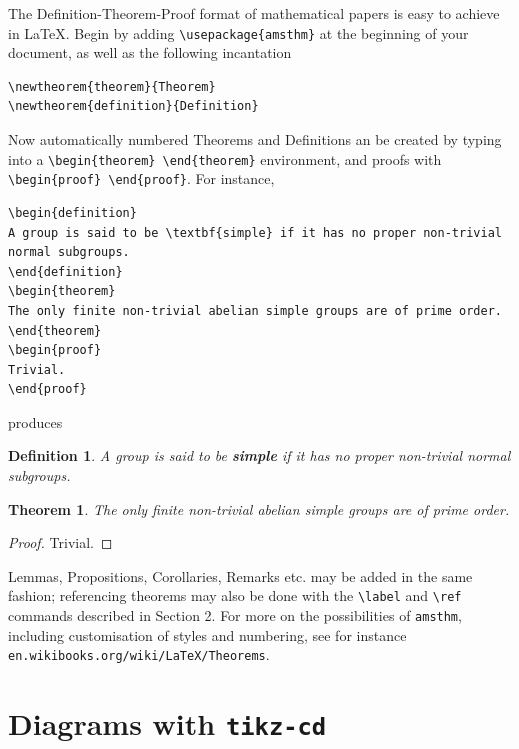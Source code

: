\documentclass[10pt]{article}
\newtheorem{definition}{Definition}
\newtheorem{theorem}{Theorem}
\begin{document}
The Definition-Theorem-Proof format of mathematical papers is easy to achieve in \LaTeX. Begin by adding \verb$\usepackage{amsthm}$ at the beginning of your document, as well as the following incantation
\begin{verbatim}
\newtheorem{theorem}{Theorem}
\newtheorem{definition}{Definition}
\end{verbatim}
Now automatically numbered Theorems and Definitions an be created by typing into a \verb$\begin{theorem} \end{theorem}$ environment, and proofs with \verb$\begin{proof} \end{proof}$. For instance,
\begin{verbatim}
\begin{definition}
A group is said to be \textbf{simple} if it has no proper non-trivial normal subgroups. 
\end{definition}
\begin{theorem}
The only finite non-trivial abelian simple groups are of prime order.
\end{theorem}
\begin{proof}
Trivial.
\end{proof}
\end{verbatim}
produces
\begin{definition}
A group is said to be \textbf{simple} if it has no proper non-trivial normal subgroups. 
\end{definition}
\begin{theorem}
The only finite non-trivial abelian simple groups are of prime order.
\end{theorem}
\begin{proof}
Trivial.
\end{proof}

Lemmas, Propositions, Corollaries, Remarks etc. may be added in the same fashion; referencing theorems may also be done with the \verb$\label$ and \verb$\ref$ commands described in Section 2. For more on the possibilities of \texttt{amsthm}, including customisation of styles and numbering, see for instance \verb$en.wikibooks.org/wiki/LaTeX/Theorems$.

\section{Diagrams with \texttt{tikz-cd}}
\end{document}

